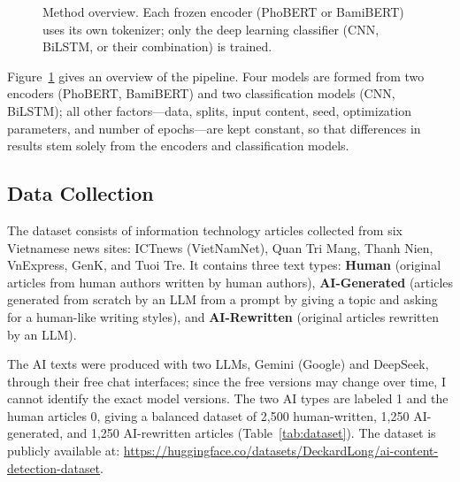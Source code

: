 \documentclass[conference,a4paper]{IEEEtran}
\begin{document}
\begin{figure}[t]
{}
  \caption{Method overview. Each frozen encoder (PhoBERT or BamiBERT) uses its own tokenizer; only the deep learning classifier (CNN, BiLSTM, or their combination) is trained.}
  \label{fig:overview}
\end{figure}

Figure~\ref{fig:overview} gives an overview of the pipeline. Four models are formed from two encoders (PhoBERT, BamiBERT) and two classification models (CNN, BiLSTM); all other factors---data, splits, input content, seed, optimization parameters, and number of epochs---are kept constant, so that differences in results stem solely from the encoders and classification models.

\subsection{Data Collection}
The dataset consists of information technology articles collected from six Vietnamese news sites: ICTnews (VietNamNet), Quan Tri Mang, Thanh Nien, VnExpress, GenK, and Tuoi Tre. It contains three text types: \textbf{Human} (original articles from human authors written by human authors), \textbf{AI-Generated} (articles generated from scratch by an LLM from a prompt by giving a topic and asking for a human-like writing styles), and \textbf{AI-Rewritten} (original articles rewritten by an LLM).

The AI texts were produced with two LLMs, Gemini (Google) and DeepSeek, through their free chat interfaces; since the free versions may change over time, I cannot identify the exact model versions. The two AI types are labeled 1 and the human articles 0, giving a balanced dataset of 2,500 human-written, 1,250 AI-generated, and 1,250 AI-rewritten articles (Table~\ref{tab:dataset}). The dataset is publicly available at: \url{https://huggingface.co/datasets/DeckardLong/ai-content-detection-dataset}.
\end{document}
